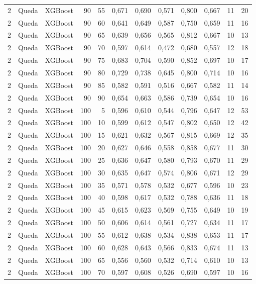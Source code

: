 \begin{longtable}{@{}rllrrrrrrrrr@{}}
2 & Queda & XGBoost & 90 & 55 & 0,671 & 0,690 & 0,571 & 0,800 & 0,667 & 11 & 20 \\
2 & Queda & XGBoost & 90 & 60 & 0,641 & 0,649 & 0,587 & 0,750 & 0,659 & 11 & 16 \\
2 & Queda & XGBoost & 90 & 65 & 0,639 & 0,656 & 0,565 & 0,812 & 0,667 & 10 & 13 \\
2 & Queda & XGBoost & 90 & 70 & 0,597 & 0,614 & 0,472 & 0,680 & 0,557 & 12 & 18 \\
2 & Queda & XGBoost & 90 & 75 & 0,683 & 0,704 & 0,590 & 0,852 & 0,697 & 10 & 17 \\
2 & Queda & XGBoost & 90 & 80 & 0,729 & 0,738 & 0,645 & 0,800 & 0,714 & 10 & 16 \\
2 & Queda & XGBoost & 90 & 85 & 0,582 & 0,591 & 0,516 & 0,667 & 0,582 & 11 & 14 \\
2 & Queda & XGBoost & 90 & 90 & 0,654 & 0,663 & 0,586 & 0,739 & 0,654 & 10 & 16 \\
2 & Queda & XGBoost & 100 & 5 & 0,596 & 0,610 & 0,544 & 0,796 & 0,647 & 12 & 53 \\
2 & Queda & XGBoost & 100 & 10 & 0,599 & 0,612 & 0,547 & 0,802 & 0,650 & 12 & 42 \\
2 & Queda & XGBoost & 100 & 15 & 0,621 & 0,632 & 0,567 & 0,815 & 0,669 & 12 & 35 \\
2 & Queda & XGBoost & 100 & 20 & 0,627 & 0,646 & 0,558 & 0,858 & 0,677 & 11 & 30 \\
2 & Queda & XGBoost & 100 & 25 & 0,636 & 0,647 & 0,580 & 0,793 & 0,670 & 11 & 29 \\
2 & Queda & XGBoost & 100 & 30 & 0,635 & 0,647 & 0,574 & 0,806 & 0,671 & 12 & 29 \\
2 & Queda & XGBoost & 100 & 35 & 0,571 & 0,578 & 0,532 & 0,677 & 0,596 & 10 & 23 \\
2 & Queda & XGBoost & 100 & 40 & 0,598 & 0,617 & 0,532 & 0,788 & 0,636 & 11 & 18 \\
2 & Queda & XGBoost & 100 & 45 & 0,615 & 0,623 & 0,569 & 0,755 & 0,649 & 10 & 19 \\
2 & Queda & XGBoost & 100 & 50 & 0,606 & 0,614 & 0,561 & 0,727 & 0,634 & 11 & 17 \\
2 & Queda & XGBoost & 100 & 55 & 0,612 & 0,638 & 0,534 & 0,838 & 0,653 & 11 & 17 \\
2 & Queda & XGBoost & 100 & 60 & 0,628 & 0,643 & 0,566 & 0,833 & 0,674 & 11 & 13 \\
2 & Queda & XGBoost & 100 & 65 & 0,556 & 0,560 & 0,532 & 0,714 & 0,610 & 10 & 13 \\
2 & Queda & XGBoost & 100 & 70 & 0,597 & 0,608 & 0,526 & 0,690 & 0,597 & 10 & 16 \\

\end{longtable}
